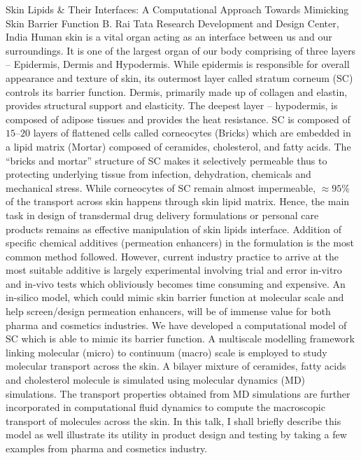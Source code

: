 
    \begin{abstract_online}{Skin Lipids & Their Interfaces: A Computational Approach Towards Mimicking Skin Barrier Function }{%
        B. Rai}{%
        \IStag}{%
        Tata Research Development and Design Center, India}
    Human skin is a vital organ acting as an interface between us and our surroundings. It is one of the largest organ of our body comprising of three layers – Epidermis, Dermis and Hypodermis. While epidermis is responsible for overall appearance and texture of skin, its outermost layer called stratum corneum (SC) controls its barrier function. Dermis, primarily made up of collagen and elastin, provides structural support and elasticity. The deepest layer – hypodermis, is composed of adipose tissues and provides the heat resistance.  SC is composed of $15–20$ layers of flattened cells called corneocytes (Bricks) which are embedded in a lipid matrix (Mortar) composed of ceramides, cholesterol, and fatty acids. The “bricks and mortar” structure of SC makes it selectively permeable thus to protecting underlying tissue from infection, dehydration, chemicals and mechanical stress. While corneocytes of SC remain almost impermeable, $\approx 95 \%$ of the transport across skin happens through skin lipid matrix. Hence, the main task in design of transdermal drug delivery formulations or personal care products remains as effective manipulation of skin lipids interface. Addition of specific chemical additives (permeation enhancers) in the formulation is the most common method followed. However, current industry practice to arrive at the most suitable additive is largely experimental involving trial and error in-vitro and in-vivo tests which obliviously becomes time consuming and expensive. An in-silico model, which could mimic skin barrier function at molecular scale and help screen/design permeation enhancers, will be of immense value for both pharma and cosmetics industries.    We have developed a computational model of SC which is able to mimic its barrier function. A multiscale modelling framework linking molecular (micro) to continuum (macro) scale is employed to study molecular transport across the skin. A bilayer mixture of ceramides, fatty acids and cholesterol molecule is simulated using molecular dynamics (MD) simulations. The transport properties obtained from MD simulations are further incorporated in computational fluid dynamics to compute the macroscopic transport of molecules across the skin. In this talk, I shall briefly describe this model as well illustrate its utility in product design and testing by taking a few examples from pharma and cosmetics industry. 
    
    \end{abstract_online}
    